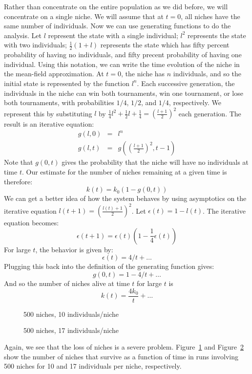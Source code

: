 Rather than concentrate on the entire population as we did before, we
will concentrate on a single niche.  We will assume that at $t=0$,
all niches have the same number of individuals.  Now 
we can use generating functions to do the analysis.
Let $l$ represent the state with a single individual; $l^2$ represents
the state with two individuals; $\frac{1}{2}(1+l)$ represents the
state which has fifty percent probability of having no individuals, and
fifty precent probability of having one individual.  Using this notation,
we can write the time evolution of the niche in the mean-field approximation.
At $t=0$, the niche has $n$ individuals, and so the initial state is
represented by the function $l^n$.  Each successive generation, the
individuals in the niche can win both tournaments, win one tournament,
or lose both tournaments, with probabilities $1/4$, $1/2$, and $1/4$,
respectively.  We represent this by substituting $l$ by 
$\frac{1}{4}l^2+\frac{1}{2}l+\frac{1}{4}=(\frac{l+1}{2})^2$ each generation.
The result is an iterative equation:
\begin{eqnarray}
g(l,0)&=&l^n \\
g(l,t)&=&g((\frac{l+1}{2})^2,t-1)
\end{eqnarray}
Note that $g(0,t)$ gives the probability that the niche will have no
individuals at time $t$.  Our estimate for the number of niches remaining
at a given time is therefore:
\begin{equation}
k(t)=k_0 (1-g(0,t))
\end{equation}
We can get a better idea of how the system behaves by using asymptotics
on the iterative equation $l(t+1)= (\frac{l(t)+1}{2})^2$.
Let $\epsilon(t)=1-l(t)$.  The iterative equation becomes:
\begin{equation}
\epsilon(t+1)=\epsilon(t)(1-\frac{1}{4}\epsilon(t))
\end{equation}
For large $t$, the behavior is given by:
\begin{equation}
\epsilon(t)=4/t+\ldots
\end{equation}
Plugging this back into the definition of the generating function gives:
\begin{equation}
g(0,t)=1-4/t+\ldots
\end{equation}
And so the number of niches alive at time $t$ for large $t$ is
\begin{equation}
k(t)=\frac{4 k_0}{t}+\ldots
\end{equation}
\begin{figure}
\label{bolztourn}
\caption{500 niches, 10 individuals/niche}
\end{figure}
\begin{figure}
\label{bolztourn2}
\caption{500 niches, 17 individuals/niche}
\end{figure}
Again, we see that the loss of niches is a severe problem.
Figure~\ref{bolztourn} and Figure~\ref{bolztourn2} show the number of
niches that survive as a function of time in runs involving 500 niches
for 10 and 17 individuals per niche, respectively.

